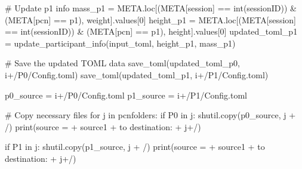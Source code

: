 \documentclass[
  letterpaper,
  DIV=11,
  numbers=noendperiod]{scrreprt}
\newenvironment{Shaded}{\begin{snugshade}}{\end{snugshade}}
\newcommand{\BuiltInTok}[1]{\textcolor[rgb]{0.00,0.23,0.31}{#1}}
\newcommand{\CommentTok}[1]{\textcolor[rgb]{0.37,0.37,0.37}{#1}}
\newcommand{\ControlFlowTok}[1]{\textcolor[rgb]{0.00,0.23,0.31}{#1}}
\newcommand{\DecValTok}[1]{\textcolor[rgb]{0.68,0.00,0.00}{#1}}
\newcommand{\KeywordTok}[1]{\textcolor[rgb]{0.00,0.23,0.31}{#1}}
\newcommand{\NormalTok}[1]{\textcolor[rgb]{0.00,0.23,0.31}{#1}}
\newcommand{\OperatorTok}[1]{\textcolor[rgb]{0.37,0.37,0.37}{#1}}
\newcommand{\StringTok}[1]{\textcolor[rgb]{0.13,0.47,0.30}{#1}}
\begin{document}
\begin{Shaded}
\begin{Highlighting}[]
    \CommentTok{\# Update p1 info}
\NormalTok{    mass\_p1 }\OperatorTok{=}\NormalTok{ META.loc[(META[}\StringTok{\textquotesingle{}session\textquotesingle{}}\NormalTok{] }\OperatorTok{==} \BuiltInTok{int}\NormalTok{(sessionID)) }\OperatorTok{\&}\NormalTok{ (META[}\StringTok{\textquotesingle{}pcn\textquotesingle{}}\NormalTok{] }\OperatorTok{==} \StringTok{\textquotesingle{}p1\textquotesingle{}}\NormalTok{), }\StringTok{\textquotesingle{}weight\textquotesingle{}}\NormalTok{].values[}\DecValTok{0}\NormalTok{]}
\NormalTok{    height\_p1 }\OperatorTok{=}\NormalTok{ META.loc[(META[}\StringTok{\textquotesingle{}session\textquotesingle{}}\NormalTok{] }\OperatorTok{==} \BuiltInTok{int}\NormalTok{(sessionID)) }\OperatorTok{\&}\NormalTok{ (META[}\StringTok{\textquotesingle{}pcn\textquotesingle{}}\NormalTok{] }\OperatorTok{==} \StringTok{\textquotesingle{}p1\textquotesingle{}}\NormalTok{), }\StringTok{\textquotesingle{}height\textquotesingle{}}\NormalTok{].values[}\DecValTok{0}\NormalTok{]}
\NormalTok{    updated\_toml\_p1 }\OperatorTok{=}\NormalTok{ update\_participant\_info(input\_toml, height\_p1, mass\_p1)}
    
    \CommentTok{\# Save the updated TOML data}
\NormalTok{    save\_toml(updated\_toml\_p0, i}\OperatorTok{+}\StringTok{\textquotesingle{}/P0/Config.toml\textquotesingle{}}\NormalTok{)}
\NormalTok{    save\_toml(updated\_toml\_p1, i}\OperatorTok{+}\StringTok{\textquotesingle{}/P1/Config.toml\textquotesingle{}}\NormalTok{)}

\NormalTok{    p0\_source }\OperatorTok{=}\NormalTok{ i}\OperatorTok{+}\StringTok{\textquotesingle{}/P0/Config.toml\textquotesingle{}}
\NormalTok{    p1\_source }\OperatorTok{=}\NormalTok{ i}\OperatorTok{+}\StringTok{\textquotesingle{}/P1/Config.toml\textquotesingle{}}

    \CommentTok{\# Copy necessary files }
    \ControlFlowTok{for}\NormalTok{ j }\KeywordTok{in}\NormalTok{ pcnfolders:}
        \ControlFlowTok{if} \StringTok{\textquotesingle{}P0\textquotesingle{}} \KeywordTok{in}\NormalTok{ j:}
\NormalTok{            shutil.copy(p0\_source, j }\OperatorTok{+} \StringTok{\textquotesingle{}/\textquotesingle{}}\NormalTok{)}
            \BuiltInTok{print}\NormalTok{(}\StringTok{\textquotesingle{}source = \textquotesingle{}} \OperatorTok{+}\NormalTok{ source1 }\OperatorTok{+} \StringTok{\textquotesingle{} to destination: \textquotesingle{}} \OperatorTok{+}\NormalTok{ j}\OperatorTok{+}\StringTok{\textquotesingle{}/\textquotesingle{}}\NormalTok{)}

        \ControlFlowTok{if} \StringTok{\textquotesingle{}P1\textquotesingle{}} \KeywordTok{in}\NormalTok{ j:}
\NormalTok{            shutil.copy(p1\_source, j }\OperatorTok{+} \StringTok{\textquotesingle{}/\textquotesingle{}}\NormalTok{)}
            \BuiltInTok{print}\NormalTok{(}\StringTok{\textquotesingle{}source = \textquotesingle{}} \OperatorTok{+}\NormalTok{ source1 }\OperatorTok{+} \StringTok{\textquotesingle{} to destination: \textquotesingle{}} \OperatorTok{+}\NormalTok{ j}\OperatorTok{+}\StringTok{\textquotesingle{}/\textquotesingle{}}\NormalTok{)}


\end{Highlighting}
\end{Shaded}
\end{document}
